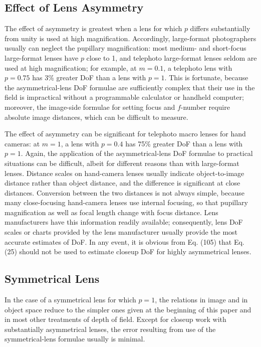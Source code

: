 \documentclass[11pt, oneside]{scrartcl}   	%
\begin{document}

\subsection{Effect of Lens Asymmetry}

The effect of asymmetry is greatest when a lens for which $p$ differs substantially from unity is used at high magnification. Accordingly, large-format photographers usually can neglect the pupillary magnification: most medium- and short-focus large-format lenses have $p$ close to 1, and telephoto large-format lenses seldom are used at high magnification; for example, at $m = 0.1$, a telephoto lens with $p  = 0.75$ has 3\% greater DoF than a lens with $p = 1$. This is fortunate, because the asymmetrical-lens DoF formulae are sufficiently complex that their use in the field is impractical without a programmable calculator or handheld computer; moreover, the image-side formulae for setting focus and $f$-number require absolute image distances, which can be difficult to measure.

The effect of asymmetry can be significant for telephoto macro lenses for hand cameras: at $m = 1$, a lens with $p = 0.4$ has 75\% greater DoF than a lens with $p = 1$. Again, the application of the asymmetrical-lens DoF formulae to practical situations can be difficult, albeit for different reasons than with large-format lenses. Distance scales on hand-camera lenses usually indicate object-to-image distance rather than object distance, and the difference is significant at close distances. Conversion between the two distances is not always simple, because many close-focusing hand-camera lenses use internal focusing, so that pupillary magnification as well as focal length change with focus distance. Lens manufacturers have this information readily available; consequently, lens DoF scales or charts provided by the lens manufacturer usually provide the most accurate estimates of DoF. In any event, it is obvious from Eq. (105) that Eq. (25) should not be used to estimate closeup DoF for highly asymmetrical lenses.

\subsection{Symmetrical Lens}

In the case of a symmetrical lens for which $p = 1$, the relations in image and in object space reduce to the simpler ones given at the beginning of this paper and in most other treatments of depth of field. Except for closeup work with substantially asymmetrical lenses, the error resulting from use of the symmetrical-lens formulae usually is minimal.
\end{document}
